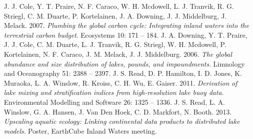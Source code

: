 \documentclass[paper=a4,fontsize=11pt]{scrartcl}
\begin{document}
    \clearpage
    \begin{thebibliography}{12}
            J. J. Cole, Y. T. Praire, N. F. Caraco, W. H. Mcdowell, L. J. Tranvik, R. G. Striegl, C. M. Duarte, P. Kortelainen, J. A. Downing, J. J. Middelburg, J. Melack. 2007. \emph{Plumbing the global carbon cycle: Integrating inland waters into the terrestrial carbon budget}. Ecosystems 10: 171 -- 184.
            J. A. Downing, Y. T. Praire, J. J. Cole, C. M. Duarte, L. J. Tranvik, R. G. Striegl, W. H. Mcdowell, P. Kortelainen, N. F. Caraco, J. M. Melack, J. J. Middelburg. 2006. \emph{The global abundance and size distribution of lakes, pounds, and impoundments}. Limnology and Oceanography 51: 2388 -- 2397.
            J. S. Read, D. P. Hamilton, I. D. Jones, K. Muraoka, L. A. Winslow, R. Kroiss, C. H. Wu, E. Gaiser. 2011.
            \emph{Derivation of lake mixing and stratification indices from high-resolution lake buoy data.} Environmental Modelling and Software 26: 1325 -- 1336.
            J. S. Read, L. A. Winslow, G. A. Hansen, J. Van Den Hoek, C. D. Markfort, N. Booth. 2013. \emph{Upscaling aquatic ecology: Linking continental data products to distributed lake models}. Poster, EarthCube Inland Waters meeting.
    \end{thebibliography}
\end{document}
